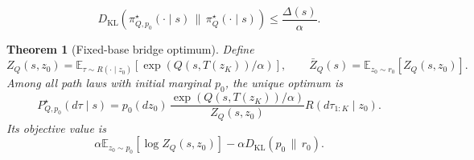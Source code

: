 \documentclass[10pt,a4paper]{amsart}
\newtheorem{theorem}{Theorem}
\begin{document}
\begin{equation}
  D_{\mathrm{KL}}
  \left(
    \pi_{Q,p_0}^\star(\cdot\mid s)
    \,\|\,\pi_Q^\star(\cdot\mid s)
  \right)
  \le
  \frac{
    \Delta(s)
  }{
    \alpha
  }.
  \label{eq:shared_base_endpoint_bound}
\end{equation}

\begin{theorem}[Fixed-base bridge optimum]
\label{thm:fixed_base_optimum}
Define
\begin{equation}
  Z_Q(s,z_0)
  =
  \mathbb E_{\tau\sim R(\cdot\mid z_0)}
  \left[
    \exp
    \left(
      Q(s,T(z_K))/\alpha
    \right)
  \right],
  \qquad
  \bar Z_Q(s)
  =
  \mathbb E_{z_0\sim r_0}
  \left[
    Z_Q(s,z_0)
  \right].
\end{equation}
Among all path laws with initial marginal $p_0$, the unique optimum is
\begin{equation}
  P_{Q,p_0}^\star(d\tau\mid s)
  =
  p_0(dz_0)\,
  \frac{
    \exp
    \left(
      Q(s,T(z_K))/\alpha
    \right)
  }{
    Z_Q(s,z_0)
  }
  R(d\tau_{1:K}\mid z_0).
  \label{eq:shared_base_optimum}
\end{equation}
Its objective value is
\begin{equation}
  \alpha
  \mathbb E_{z_0\sim p_0}
  \left[
    \log Z_Q(s,z_0)
  \right]
  -
  \alpha
  D_{\mathrm{KL}}
  \left(
    p_0
    \,\|\,
    r_0
  \right).
  \label{eq:fixed_base_objective}
\end{equation}
\end{theorem}
\end{document}
